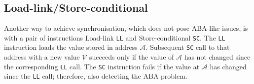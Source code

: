\subsection{Load-link/Store-conditional}
Another way to achieve synchronisation, which does not pose ABA-like issues, is with a pair of instructions Load-link \texttt{LL} and Store-conditional \texttt{SC}. The \texttt{LL} instruction loads the value stored in address $\mathcal{A}$. Subsequent \texttt{SC} call to that address with a new value $\mathcal{V}$ succeeds only if the value of $\mathcal{A}$ has not changed since the corresponding \texttt{LL} call. The \texttt{SC} instruction fails if the value at $\mathcal{A}$ has changed since the \texttt{LL} call; therefore, also detecting the ABA problem.